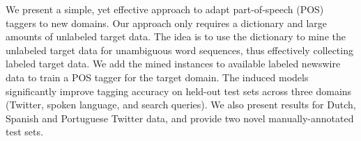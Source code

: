 We present a simple, yet effective approach to adapt part-of-speech (POS) taggers to new domains. Our approach only requires a dictionary and large amounts of unlabeled target data. The idea is to use the dictionary to mine the unlabeled target data for unambiguous word sequences, thus effectively collecting labeled target data. We add the mined instances to available labeled newswire data to train a POS tagger for the target domain. The induced models significantly improve tagging accuracy on held-out test sets across three domains (Twitter, spoken language, and search queries). We also present results for Dutch, Spanish and Portuguese Twitter data, and provide two novel manually-annotated test sets.
